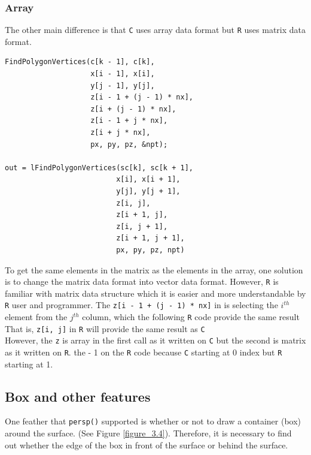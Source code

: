\documentclass[11pt,twoside]{report}
\begin{document}
\subsubsection{Array}
The other main difference is that \texttt{C} uses array data format but \texttt{R} uses matrix data format. 
\begin{lstlisting}
FindPolygonVertices(c[k - 1], c[k],
                    x[i - 1], x[i],
                    y[j - 1], y[j],
                    z[i - 1 + (j - 1) * nx],
                    z[i + (j - 1) * nx],
                    z[i - 1 + j * nx],
                    z[i + j * nx],
                    px, py, pz, &npt);

out = lFindPolygonVertices(sc[k], sc[k + 1],
                          x[i], x[i + 1],
                          y[j], y[j + 1],
                          z[i, j],
                          z[i + 1, j],
                          z[i, j + 1],
                          z[i + 1, j + 1],
                          px, py, pz, npt)
\end{lstlisting}



To get the same elements in the matrix as the elements in the array, one solution is to change the matrix data format into vector data format. However, \texttt{R} is familiar with matrix data structure which it is easier and more understandable by \texttt{R} user and programmer. The \texttt{z[i - 1 + (j - 1) * nx]} in  is selecting the $i^{th}$ element from the $j^{th}$ column, which the following \texttt{R} code provide the same result That is, \texttt{z[i, j]} in \texttt{R} will provide the same result as \texttt{C} \\

However, the \texttt{z} is array in the first call as it written on \texttt{C} but the second is matrix as it written on \texttt{R}. the - 1 on the \texttt{R} code because \texttt{C} starting at 0 index but \texttt{R} starting at 1.\\

\subsection{Box and other features}
One feather that \texttt{persp()} supported is whether or not to draw a container (box) around the surface. (See Figure \ref{figure_3.4}). Therefore, it is necessary to find out whether the edge of the box in front of the surface or behind the surface. \\ 
\end{document}
